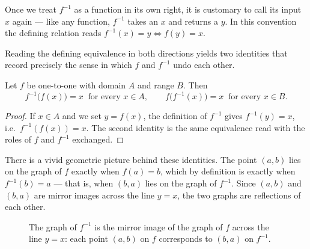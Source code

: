 \begin{remark}
Once we treat \(f^{-1}\) as a function in its own right, it is customary to call its input \(x\) again --- like any function, \(f^{-1}\) takes an \(x\) and returns a \(y\). In this convention the defining relation reads \(f^{-1}(x) = y \Leftrightarrow f(y) = x\).
\end{remark}

Reading the defining equivalence in both directions yields two identities that record precisely the sense in which \(f\) and \(f^{-1}\) undo each other.

\begin{proposition}\label{prop:cancellation-equations}
Let \(f\) be one-to-one with domain \(A\) and range \(B\). Then
\[
f^{-1}\bigl(f(x)\bigr) = x \ \text{ for every } x \in A,
\qquad
f\bigl(f^{-1}(x)\bigr) = x \ \text{ for every } x \in B.
\]
\end{proposition}

\begin{proof}
If \(x \in A\) and we set \(y = f(x)\), the definition of \(f^{-1}\) gives \(f^{-1}(y) = x\), i.e.\ \(f^{-1}(f(x)) = x\). The second identity is the same equivalence read with the roles of \(f\) and \(f^{-1}\) exchanged.
\end{proof}

There is a vivid geometric picture behind these identities. The point \((a, b)\) lies on the graph of \(f\) exactly when \(f(a) = b\), which by definition is exactly when \(f^{-1}(b) = a\) --- that is, when \((b, a)\) lies on the graph of \(f^{-1}\). Since \((a, b)\) and \((b, a)\) are mirror images across the line \(y = x\), the two graphs are reflections of each other.

\begin{figure}[H]
\centering
{}
\caption{The graph of \(f^{-1}\) is the mirror image of the graph of \(f\) across the line \(y = x\): each point \((a, b)\) on \(f\) corresponds to \((b, a)\) on \(f^{-1}\).}
\label{fig:reflection-y-equals-x}
\end{figure}

